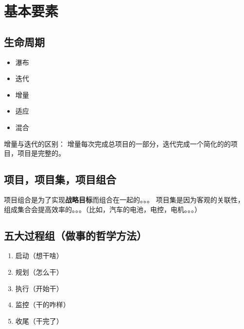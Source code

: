 
\chapter{基本要素}

\section{生命周期}

\begin{itemize}
\item 瀑布
\item 迭代
\item 增量
\item 适应
\item 混合
\end{itemize}


增量与迭代的区别：
增量每次完成总项目的一部分，迭代完成一个简化的的项目，项目是完整的。


\section{项目，项目集，项目组合}

项目组合是为了实现\textbf{战略目标}而组合在一起的。。。
项目集是因为客观的关联性，组成集合会提高效率的。。。（比如，汽车的电池，电控，电机。。。）


\section{五大过程组（做事的哲学方法）}

\begin{enumerate}
\item 启动（想干啥）
\item 规划（怎么干）
\item 执行（开始干）
\item 监控（干的咋样）
\item 收尾（干完了）
\end{enumerate}


